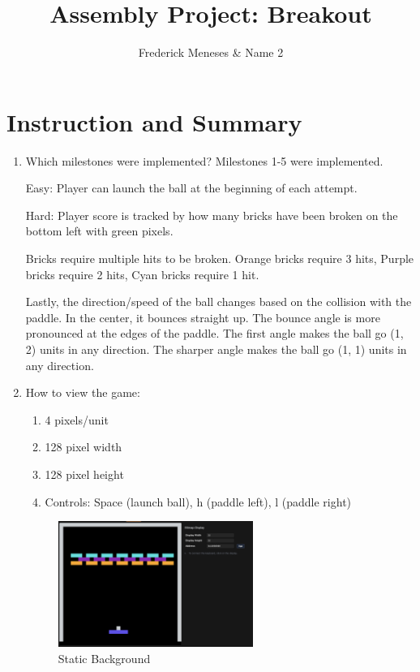 \documentclass{article}
\title{Assembly Project: Breakout}
\author{Frederick Meneses & Name 2}
\begin{document}
\maketitle

\section{Instruction and Summary}

\begin{enumerate}

    \item Which milestones were implemented? 
    Milestones 1-5 were implemented. 
    
    Easy: Player can launch the ball at the beginning of each attempt.
    
    Hard: Player score is tracked by how many bricks have been broken on the bottom left with green pixels. 
    
    Bricks require multiple hits to be broken. Orange bricks require 3 hits, Purple bricks require 2 hits, Cyan bricks require 1 hit. 
    
    Lastly, the direction/speed of the ball changes based on the collision with the paddle. In the center, it bounces straight up. The bounce angle is more pronounced at the edges of the paddle. The first angle makes the ball go (1, 2) units in any direction. The sharper angle makes the ball go (1, 1) units in any direction.
    
    \item How to view the game:
    
    \begin{enumerate}

    \item	4 pixels/unit
    \item	128 pixel width
    \item	128 pixel height
    \item Controls: Space (launch ball), h (paddle left), l (paddle right)

    \end{enumerate}

    
\begin{figure}[ht!]
    \centering
    \includegraphics[width=0.6\textwidth]{static.png}
    \caption{Static Background}
    \label{Static}
\end{figure}


\end{enumerate}
\end{document}
